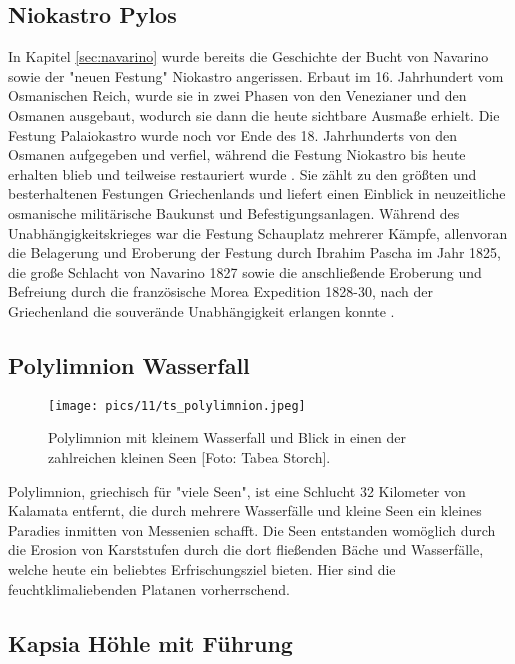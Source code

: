 \documentclass[preprint]{geomorphica} %
\begin{document}
\subsection{Niokastro Pylos}
\label{sec:niokastro}

In Kapitel \ref{sec:navarino} wurde bereits die Geschichte der Bucht von Navarino sowie der "neuen Festung" Niokastro angerissen. Erbaut im 16. Jahrhundert vom Osmanischen Reich, wurde sie in zwei Phasen von den Venezianer und den Osmanen ausgebaut, wodurch sie dann die heute sichtbare Ausmaße erhielt. Die Festung Palaiokastro wurde noch vor Ende des 18. Jahrhunderts von den Osmanen aufgegeben und verfiel, während die Festung Niokastro bis heute erhalten blieb und teilweise restauriert wurde \cite{Davis2008}. Sie zählt zu den größten und besterhaltenen Festungen
Griechenlands und liefert einen Einblick in neuzeitliche osmanische militärische Baukunst und Befestigungsanlagen. Während des Unabhängigkeitskrieges war die Festung Schauplatz mehrerer Kämpfe, allenvoran die Belagerung und Eroberung der Festung durch Ibrahim Pascha im Jahr 1825, die große Schlacht von Navarino 1827 sowie die anschließende Eroberung und Befreiung durch die französische Morea Expedition 1828-30, nach der Griechenland die souverände Unabhängigkeit erlangen konnte \cite{Brewer2001}.

\subsection{Polylimnion Wasserfall}

\begin{figure}[h]
    \centering
    \texttt{[image: pics/11/ts\_polylimnion.jpeg]}
    \caption{Polylimnion mit kleinem Wasserfall und Blick in einen der zahlreichen kleinen Seen [Foto: Tabea Storch].}
    \label{pic:polylimnion}
\end{figure}

Polylimnion, griechisch für "viele Seen", ist eine Schlucht 32 Kilometer von Kalamata entfernt, die durch mehrere Wasserfälle und kleine Seen ein kleines Paradies inmitten von Messenien schafft. Die Seen entstanden womöglich durch die Erosion von Karststufen durch die dort fließenden Bäche und Wasserfälle, welche heute ein beliebtes Erfrischungsziel bieten. Hier sind die feuchtklimaliebenden Platanen vorherrschend. 

\subsection{Kapsia Höhle mit Führung}
\label{sec:kapsia}
\end{document}
